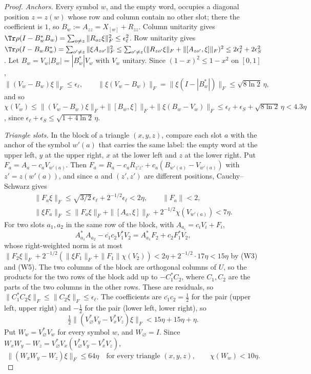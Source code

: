 \begin{proof}
\emph{Anchors.} Every symbol $w$, and the empty word, occupies a diagonal position $z=z(w)$ whose row and column contain no other slot; there the
coefficient is $1$, so $B_w:=A_{zz}=X_{[w]}+R_{zz}$. Column unitarity gives $\Tr\rho(I-B_w^*B_w)=\sum_{o\ne z}\|R_{oz}\xi\|_F^2\le\epsilon_\ell^2$. Row
unitarity gives $\Tr\rho(I-B_wB_w^*)=\sum_{o'\ne z}\|\xi A_{zo'}\|_F^2\le\sum_{o'\ne z}(\|R_{zo'}\xi\|_F+\|[A_{zo'},\xi]\|_F)^2\le2\epsilon_\ell^2+2\epsilon_S^2$.
Let $B_w=V_w|B_w|=|B_w^*|V_w$ with $V_w$ unitary. Since $(1-x)^2\le1-x^2$ on $[0,1]$,
\[
\|(V_w-B_w)\xi\|_F\le\epsilon_\ell,\qquad\|\xi(V_w-B_w)\|_F=\|\xi(I-|B_w^*|)\|_F\le\sqrt{8\ln2}\,\eta,
\]
and so $\chi(V_w)\le\|(V_w-B_w)\xi\|_F+\|[B_w,\xi]\|_F+\|\xi(B_w-V_w)\|_F\le\epsilon_\ell+\epsilon_S+\sqrt{8\ln2}\,\eta<4.3\eta$, since
$\epsilon_\ell+\epsilon_S\le\sqrt{1+4\ln2}\,\eta$.

\emph{Triangle slots.} In the block of a triangle $(x,y,z)$, compare each slot $a$ with the anchor of the symbol $w'(a)$ that carries the same
label: the empty word at the upper left, $y$ at the upper right, $x$ at the lower left and $z$ at the lower right. Put $F_a=A_a-c_aV_{w'(a)}$. Then
$F_a=R_a-c_aR_{z'z'}+c_a(B_{w'(a)}-V_{w'(a)})$ with $z'=z(w'(a))$, and since $a$ and $(z',z')$ are different positions, Cauchy--Schwarz gives
\begin{gather*}
\|F_a\xi\|_F\le\sqrt{3/2}\,\epsilon_\ell+2^{-1/2}\epsilon_\ell<2\eta,\qquad\|F_a\|<2,\\
\|\xi F_a\|_F\le\|F_a\xi\|_F+\|[A_a,\xi]\|_F+2^{-1/2}\chi(V_{w'(a)})<7\eta .
\end{gather*}
For two slots $a_1,a_2$ in the same row of the block, with $A_{a_i}=c_iV_i+F_i$,
\[
A_{a_1}^*A_{a_2}-\overline{c_1}c_2V_1^*V_2=A_{a_1}^*F_2+c_2F_1^*V_2,
\]
whose right-weighted norm is at most $\|F_2\xi\|_F+2^{-1/2}(\|\xi F_1\|_F+\|F_1\|\chi(V_2))<2\eta+2^{-1/2}\cdot17\eta<15\eta$ by (W3) and (W5). The two
columns of the block are orthogonal columns of $U$, so the products for the two rows of the block add up to $-C_1^*C_2$, where $C_1,C_2$ are the
parts of the two columns in the other rows. These are residuals, so $\|C_1^*C_2\xi\|_F\le\|C_2\xi\|_F\le\epsilon_\ell$. The coefficients are
$\overline{c_1}c_2=\frac12$ for the pair (upper left, upper right) and $-\frac12$ for the pair (lower left, lower right), so
\[
\tfrac12\|(V_\varnothing^*V_y-V_x^*V_z)\xi\|_F<15\eta+15\eta+\eta .
\]
Put $W_w=V_\varnothing^*V_w$ for every symbol $w$, and $W_\varnothing=I$. Since $W_xW_y-W_z=V_\varnothing^*V_x(V_\varnothing^*V_y-V_x^*V_z)$,
\begin{equation}\label{eq:triangle}
\|(W_xW_y-W_z)\xi\|_F\le64\eta\quad\text{for every triangle }(x,y,z),\qquad\chi(W_w)<10\eta .
\end{equation}


\end{proof}
